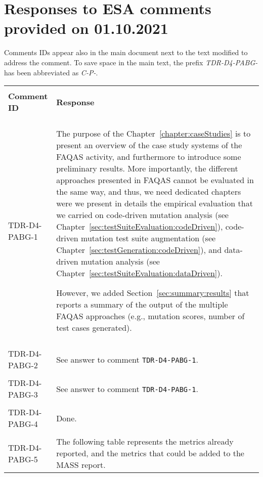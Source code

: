 
\section{Responses to ESA comments provided on 01.10.2021}
\label{sec:ESA:comments:1}

Comments IDs appear also in the main document next to the text modified to address the comment. To save space in the main text, the prefix \emph{TDR-D4-PABG-} has been abbreviated as \emph{C-P-}.

\setlength\LTleft{0pt}
\setlength\LTright{0pt}
\tiny 
\begin{longtable}{|p{2cm}|p{12cm}|@{}} 
\hline
\\
\textbf{Comment ID}&\textbf{Response}\\
\\
\hline
TDR-D4-PABG-1&
\begin{minipage}{12cm}
The purpose of the Chapter~\ref{chapter:caseStudies} is to present an overview of the case study systems of the FAQAS activity, and furthermore to introduce some preliminary results. More importantly, the different approaches presented in FAQAS cannot be evaluated in the same way, and thus, we need dedicated chapters were we present in details the empirical evaluation that we carried on code-driven mutation analysis (see Chapter~\ref{sec:testSuiteEvaluation:codeDriven}), code-driven mutation test suite augmentation (see Chapter~\ref{sec:testGeneration:codeDriven}), and data-driven mutation analysis (see Chapter~\ref{sec:testSuiteEvaluation:dataDriven}).

However, we added Section~\ref{sec:summary:results} that reports a summary of the output of the multiple FAQAS approaches (e.g., mutation scores, number of test cases generated).
\end{minipage}\\
\\
\hline  
TDR-D4-PABG-2&
\begin{minipage}{12cm}
See answer to comment \texttt{TDR-D4-PABG-1}.
\end{minipage}\\
\\
\hline  
TDR-D4-PABG-3&
\begin{minipage}{12cm}
See answer to comment \texttt{TDR-D4-PABG-1}.
\end{minipage}\\
\\
\hline  
TDR-D4-PABG-4&
\begin{minipage}{12cm}
Done.
\end{minipage}\\
\\
\hline  
TDR-D4-PABG-5&
\begin{minipage}{12cm}
The following table represents the metrics already reported, and the metrics that could be added to the MASS report.


\end{minipage}
\end{longtable}
